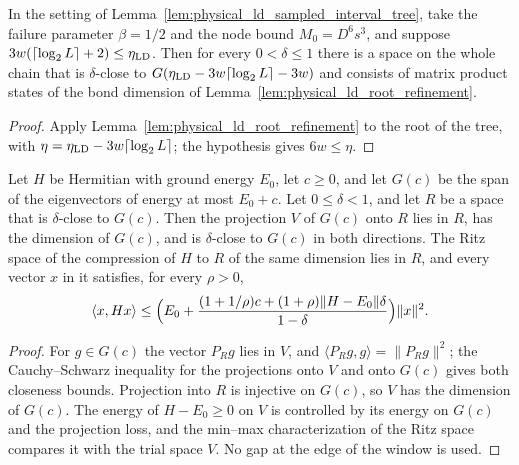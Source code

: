 \begin{lemma}
    \label{lem:physical_ld_tree_refined_approximation}
    \leanok
    In the setting of Lemma~\ref{lem:physical_ld_sampled_interval_tree}, take
    the failure parameter $\beta=1/2$ and the node bound $M_0=D^6s^3$, and
    suppose $3w(\lceil\log_2L\rceil+2)\le\eta_{\rm LD}$. Then for every
    $0<\delta\le1$ there is a space on the whole chain that is $\delta$-close
    to $G(\eta_{\rm LD}-3w\lceil\log_2L\rceil-3w)$ and consists of matrix
    product states of the bond dimension of
    Lemma~\ref{lem:physical_ld_root_refinement}.
\end{lemma}
\begin{proof}\leanok
    Apply Lemma~\ref{lem:physical_ld_root_refinement} to the root of the tree,
    with $\eta=\eta_{\rm LD}-3w\lceil\log_2L\rceil$; the hypothesis gives
    $6w\le\eta$.
\end{proof}

\begin{lemma}
    \label{lem:window_extraction}
    \leanok
    Let $H$ be Hermitian with ground energy $E_0$, let $c\ge0$, and let
    $G(c)$ be the span of the eigenvectors of energy at most $E_0+c$. Let
    $0\le\delta<1$, and let $R$ be a space that is $\delta$-close to $G(c)$.
    Then the projection $V$ of $G(c)$ onto $R$ lies in $R$, has the dimension
    of $G(c)$, and is $\delta$-close to $G(c)$ in both directions. The Ritz
    space of the compression of $H$ to $R$ of the same dimension lies in $R$,
    and every vector $x$ in it satisfies, for every $\rho>0$,
    \[
        \langle x,Hx\rangle\le\Bigl(E_0+
        \frac{(1+1/\rho)c+(1+\rho)\|H-E_0\|\delta}{1-\delta}\Bigr)\|x\|^2.
    \]
\end{lemma}
\begin{proof}\leanok
    For $g\in G(c)$ the vector $P_Rg$ lies in $V$, and $\langle P_Rg,g\rangle=
        \|P_Rg\|^2$; the Cauchy--Schwarz inequality for the projections onto $V$
    and onto $G(c)$ gives both closeness bounds. Projection into $R$ is
    injective on $G(c)$, so $V$ has the dimension of $G(c)$. The energy of
    $H-E_0\ge0$ on $V$ is controlled by its energy on $G(c)$ and the
    projection loss, and the min--max characterization of the Ritz space
    compares it with the trial space $V$. No gap at the edge of the window
    is used.
\end{proof}

